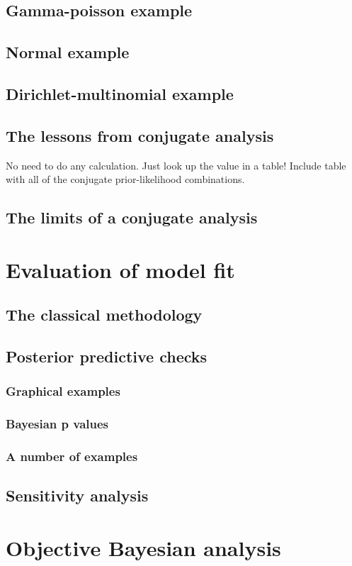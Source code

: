 \documentclass[11pt,fullpage]{book}
\begin{document}
\section{Gamma-poisson example}
\section{Normal example}
\section{Dirichlet-multinomial example}
\section{The lessons from conjugate analysis}
No need to do any calculation. Just look up the value in a table!
Include table with all of the conjugate prior-likelihood combinations.
\section{The limits of a conjugate analysis}

\chapter{Evaluation of model fit}\label{chap:ModelFit}
\section{The classical methodology}
\section{Posterior predictive checks}
\subsection{Graphical examples}
\subsection{Bayesian p values}
\subsection{A number of examples}
\section{Sensitivity analysis}


\chapter{Objective Bayesian analysis}\label{chap:ObjectiveBayes}
\end{document}
